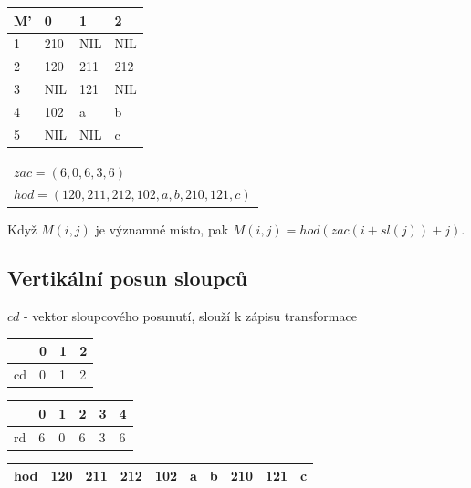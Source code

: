 \begin{priklad}
\begin{tabular}{|l|lll|}
\hline
M' & 0 & 1 & 2 \\
\hline
1 & 210 & NIL & NIL \\
2 & 120 & 211 & 212 \\
3 & NIL & 121 & NIL \\
4 & 102 & a & b \\
5 & NIL & NIL & c \\
\hline
\end{tabular}

\hspace{5mm}

\begin{tabular}{l}
$zac = (6,0,6,3,6)$ \\
$hod = (120, 211, 212, 102, a, b, 210, 121, c)$
\end{tabular}

Když $M(i,j)$ je významné místo, pak $M(i,j) = hod(zac(i+sl(j)) + j)$.

\subsection{Vertikální posun sloupců}

$cd$ - vektor sloupcového posunutí, slouží k zápisu transformace

\vspace{5mm}

\begin{tabular}{|l|lll|}
\hline
   & 0 & 1 & 2 \\
\hline
cd & 0 & 1 & 2 \\
\hline
\end{tabular}
\par

\vspace{5mm}

\begin{tabular}{|l|lllll|}
\hline
   & 0 & 1 & 2 & 3 & 4 \\
\hline
rd & 6 & 0 & 6 & 3 & 6 \\
\hline
\end{tabular}
\par

\vspace{5mm}

\begin{tabular}{|l|lllllllll|}
\hline
hod & 120 & 211 & 212 & 102 & a & b & 210 & 121 & c \\
\hline
\end{tabular}

\hspace{3mm}

\end{priklad}


